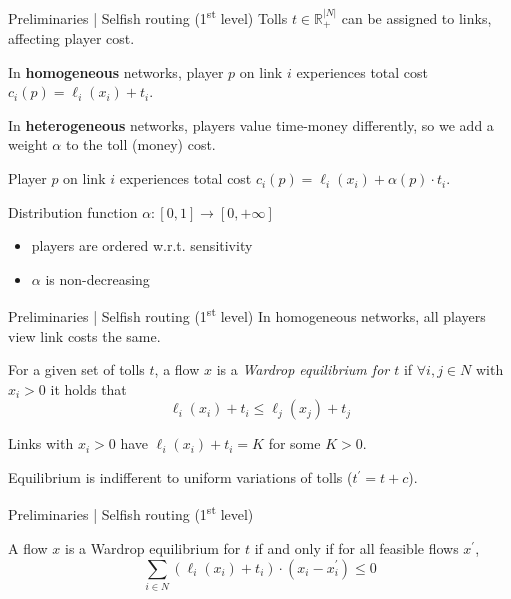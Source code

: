 \documentclass{beamer}
\newcommand{\R}{\mathbb{R}}
\begin{document}
\begin{frame}{Preliminaries | Selfish routing (1\textsuperscript{st} level)}
	Tolls $t \in \R_+^{|N|}$ can be assigned to links, affecting player cost.

	In \textbf{homogeneous} networks, player $p$ on link $i$ experiences total cost $c_i(p) = \ell_i(x_i) + t_i$.

	In \textbf{heterogeneous} networks, players value time-money differently, so we add a weight $\alpha$ to the toll (money) cost.

	Player $p$ on link $i$ experiences total cost $c_i(p) = \ell_i(x_i) + \alpha(p) \cdot t_i$.
	\begin{block}{Distribution function $\alpha: [0, 1] \rightarrow [0, +\infty]$}
		\begin{itemize}
			\item players are ordered w.r.t. sensitivity
			\item $\alpha$ is non-decreasing
		\end{itemize}
	\end{block}
\end{frame}

\begin{frame}{Preliminaries | Selfish routing (1\textsuperscript{st} level)}
	In homogeneous networks, all players view link costs the same.
	\begin{definition}
		For a given set of tolls $t$, a flow $x$ is a \textit{Wardrop equilibrium for $t$} if $\forall i, j \in N$ with $x_i > 0$ it holds that
		\begin{equation*}
			\ell_i(x_i) + t_i \leq \ell_j(x_j) + t_j
		\end{equation*}
	\end{definition}
	Links with $x_i > 0$ have $\ell_i(x_i) + t_i = K$ for some $K > 0$.

	Equilibrium is indifferent to uniform variations of tolls ($t^\prime = t + c$).
\end{frame}

\begin{frame}{Preliminaries | Selfish routing (1\textsuperscript{st} level)}
	\begin{lemma}
		A flow $x$ is a Wardrop equilibrium for $t$ if and only if for all feasible flows $x^\prime$,
		\[\sum_{i \in N} (\ell_i(x_i) + t_i) \cdot (x_i - x_i^\prime) \leq 0\]
	\end{lemma}
\end{frame}
\end{document}
